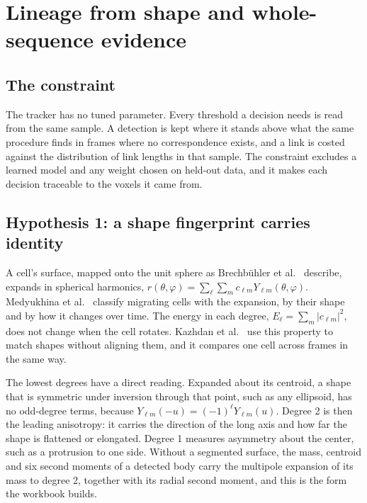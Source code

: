 \chapter{\texorpdfstring{Lineage from shape and whole-sequence evidence}{Lineage from shape and whole-sequence evidence}}
\label{chap:proposal}

\section{\texorpdfstring{The constraint}{The constraint}}

The tracker has no tuned parameter. Every threshold a decision needs is read from the same sample. A detection is kept where it stands above what the same procedure finds in frames where no correspondence exists, and a link is costed against the distribution of link lengths in that sample. The constraint excludes a learned model and any weight chosen on held-out data, and it makes each decision traceable to the voxels it came from.

\section{\texorpdfstring{Hypothesis 1: a shape fingerprint carries identity}{Hypothesis 1: a shape fingerprint carries identity}}

A cell's surface, mapped onto the unit sphere as Brechbühler et al.~\cite{src:Brechbuhler-1995} describe, expands in spherical harmonics, \(r(\theta, \varphi) = \sum_{\ell} \sum_{m} c_{\ell m} Y_{\ell m}(\theta, \varphi)\). Medyukhina et al.~\cite{src:Medyukhina-2020} classify migrating cells with the expansion, by their shape and by how it changes over time. The energy in each degree, \(E_\ell = \sum_m |c_{\ell m}|^2\), does not change when the cell rotates. Kazhdan et al.~\cite{src:Kazhdan-2003} use this property to match shapes without aligning them, and it compares one cell across frames in the same way.

The lowest degrees have a direct reading. Expanded about its centroid, a shape that is symmetric under inversion through that point, such as any ellipsoid, has no odd-degree terms, because \(Y_{\ell m}(-u) = (-1)^\ell Y_{\ell m}(u)\). Degree 2 is then the leading anisotropy: it carries the direction of the long axis and how far the shape is flattened or elongated. Degree 1 measures asymmetry about the center, such as a protrusion to one side. Without a segmented surface, the mass, centroid and six second moments of a detected body carry the multipole expansion of its mass to degree 2, together with its radial second moment, and this is the form the workbook builds.


